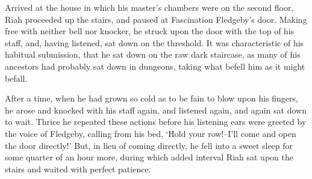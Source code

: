 Arrived at the house in which his master’s chambers were on the
second floor, Riah proceeded up the stairs, and paused at Fascination
Fledgeby’s door. Making free with neither bell nor knocker, he struck
upon the door with the top of his staff, and, having listened, sat down
on the threshold. It was characteristic of his habitual submission,
that he sat down on the raw dark staircase, as many of his ancestors
had probably sat down in dungeons, taking what befell him as it might
befall.

After a time, when he had grown so cold as to be fain to blow upon his
fingers, he arose and knocked with his staff again, and listened again,
and again sat down to wait. Thrice he repeated these actions before his
listening ears were greeted by the voice of Fledgeby, calling from his
bed, ‘Hold your row!--I’ll come and open the door directly!’ But, in
lieu of coming directly, he fell into a sweet sleep for some quarter of
an hour more, during which added interval Riah sat upon the stairs and
waited with perfect patience.

